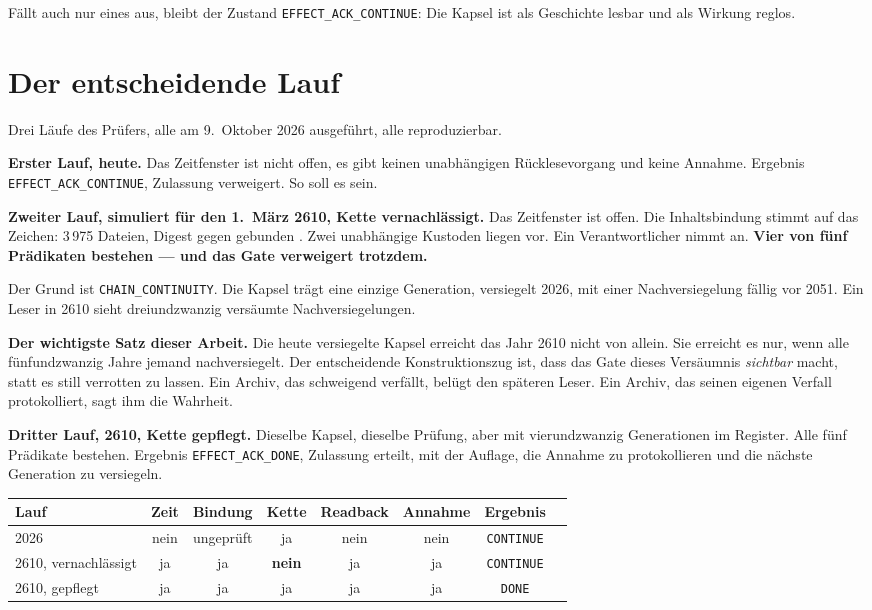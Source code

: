 \documentclass[11pt,a4paper]{article}
\theoremstyle{remark}
\newcommand{\hash}[1]{{\ttfamily\small\seqsplit{#1}}}
\newcommand{\statusbox}[2]{%
  \par\medskip\noindent
  \colorbox{#1}{\parbox{\dimexpr\linewidth-2\fboxsep\relax}{#2}}%
  \par\medskip
}
\begin{document}
Fällt auch nur eines aus, bleibt der Zustand \texttt{EFFECT\_ACK\_CONTINUE}:
Die Kapsel ist als Geschichte lesbar und als Wirkung reglos.

\section{Der entscheidende Lauf}

Drei Läufe des Prüfers, alle am 9.~Oktober 2026 ausgeführt, alle
reproduzierbar.

\textbf{Erster Lauf, heute.} Das Zeitfenster ist nicht offen, es gibt keinen
unabhängigen Rücklesevorgang und keine Annahme. Ergebnis
\texttt{EFFECT\_ACK\_CONTINUE}, Zulassung verweigert. So soll es sein.

\textbf{Zweiter Lauf, simuliert für den 1.~März 2610, Kette vernachlässigt.}
Das Zeitfenster ist offen. Die Inhaltsbindung stimmt auf das Zeichen:
3\,975 Dateien, Digest \hash{f18ca4376e8a} gegen gebunden
\hash{f18ca4376e8a}. Zwei unabhängige Kustoden liegen vor. Ein
Verantwortlicher nimmt an. \textbf{Vier von fünf Prädikaten bestehen --- und
das Gate verweigert trotzdem.}

Der Grund ist \texttt{CHAIN\_CONTINUITY}. Die Kapsel trägt eine einzige
Generation, versiegelt 2026, mit einer Nachversiegelung fällig vor 2051. Ein
Leser in 2610 sieht dreiundzwanzig versäumte Nachversiegelungen.

\statusbox{QAmber}{
  \textbf{Der wichtigste Satz dieser Arbeit.}
  Die heute versiegelte Kapsel erreicht das Jahr 2610 nicht von allein.
  Sie erreicht es nur, wenn alle fünfundzwanzig Jahre jemand nachversiegelt.
  Der entscheidende Konstruktionszug ist, dass das Gate dieses Versäumnis
  \emph{sichtbar} macht, statt es still verrotten zu lassen. Ein Archiv, das
  schweigend verfällt, belügt den späteren Leser. Ein Archiv, das seinen
  eigenen Verfall protokolliert, sagt ihm die Wahrheit.
}

\textbf{Dritter Lauf, 2610, Kette gepflegt.} Dieselbe Kapsel, dieselbe
Prüfung, aber mit vierundzwanzig Generationen im Register. Alle fünf
Prädikate bestehen. Ergebnis \texttt{EFFECT\_ACK\_DONE}, Zulassung erteilt,
mit der Auflage, die Annahme zu protokollieren und die nächste Generation zu
versiegeln.

\begin{table}[h]
\centering
\small
\begin{tabular}{@{}lccccccl@{}}
\toprule
\textbf{Lauf} & \textbf{Zeit} & \textbf{Bindung} & \textbf{Kette} &
\textbf{Readback} & \textbf{Annahme} & \textbf{Ergebnis} \\
\midrule
2026 & nein & ungeprüft & ja & nein & nein & \texttt{CONTINUE} \\
2610, vernachlässigt & ja & ja & \textbf{nein} & ja & ja & \texttt{CONTINUE} \\
2610, gepflegt & ja & ja & ja & ja & ja & \texttt{DONE} \\
\bottomrule
\end{tabular}
\end{table}
\end{document}

